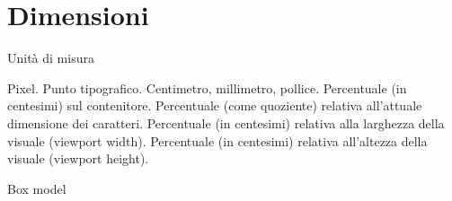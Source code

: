 \section{Dimensioni}

\begin{frame}{Unità di misura}\transfade\centering
  \begin{description}[<+->]
    \itemtt[px] Pixel.
    \itemtt[pt] Punto tipografico.
    \itemtt[cm, mm, in] Centimetro, millimetro, pollice.
    \medskip
    \itemtt[\%] Percentuale (in centesimi) sul contenitore.
    \itemtt[em] Percentuale (come quoziente) relativa all'attuale dimensione dei caratteri.
    \itemtt[vw] Percentuale (in centesimi) relativa alla larghezza della visuale (viewport width).  
    \itemtt[vh] Percentuale (in centesimi) relativa all'altezza della visuale (viewport height).  
  \end{description}
\end{frame}

\begin{frame}{Box model}\transfade\centering
  \\
\end{frame}

